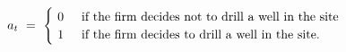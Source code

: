 \begin{equation}
    a_{t} \ = \ 
    \begin{cases}
        \ 0 \hspace{0.5cm} \text{if the firm decides not to drill a well in the site} \\
        \ 1 \hspace{0.5cm} \text{if the firm decides to drill a well in the site.}
    \end{cases}
\label{Equation:DCDP-Model_Control-Variable}
\end{equation}